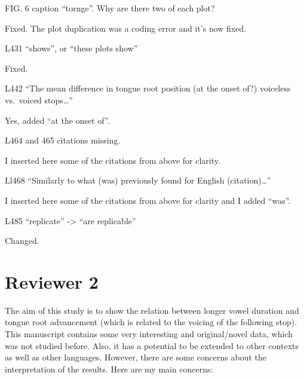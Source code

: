 \documentclass[]{article}
\begin{document}
FIG. 6 caption ``tornge''. Why are there two of each plot?

\color{plum}

Fixed. The plot duplication was a coding error and it's now fixed.
\color{black}

L431 ``shows'', or ``these plots show''

\color{plum}

Fixed. \color{black}

L442 ``The mean difference in tongue root position (at the onset of?)
voiceless vs.~voiced stops\ldots{}''

\color{plum}

Yes, added ``at the onset of''. \color{black}

L464 and 465 citations missing.

\color{plum}

I inserted here some of the citations from above for clarity.
\color{black}

Ll468 ``Similarly to what (was) previously found for English
(citation)\ldots{}''

\color{plum}

I inserted here some of the citations from above for clarity and I added
``was''. \color{black}

L485 ``replicate'' -\textgreater{} ``are replicable''

\color{plum}

Changed. \color{black}

\hypertarget{reviewer-2}{%
\section{Reviewer 2}\label{reviewer-2}}

The aim of this study is to show the relation between longer vowel
duration and tongue root advancement (which is related to the voicing of
the following stop). This manuscript contains some very interesting and
original/novel data, which was not studied before. Also, it has a
potential to be extended to other contexts as well as other languages.
However, there are some concerns about the interpretation of the
results. Here are my main concerns:
\end{document}
